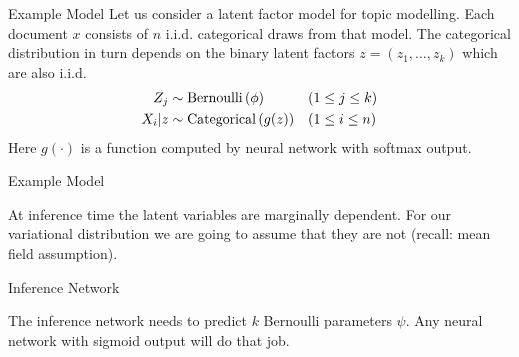 \documentclass[14pt]{beamer}
\begin{document}
\begin{frame}{Example Model}
Let us consider a latent factor model for topic modelling. Each document $ x $ consists of $ n $ i.i.d.
categorical draws from that model. The categorical distribution in turn depends on the binary latent 
factors $ z = (z_{1},\ldots,z_{k}) $ which are also i.i.d.
\begin{equation*}
\begin{aligned}
Z_{j} &\sim \operatorname{Bernoulli}\left(\phi\right) && (1 \leq j \leq k) \\ 
X_{i}|z &\sim \operatorname{Categorical}\left(g(z)\right) && (1 \leq i \leq n)
\end{aligned}
\end{equation*} 
Here $ g(\cdot) $ is a function computed by neural network with softmax output.
\end{frame}

\begin{frame}{Example Model}
\begin{figure}
\center
{}
\end{figure}
At inference time the latent variables are marginally dependent. For our variational distribution
we are going to assume that they are not (recall: mean field assumption).
\end{frame}

\begin{frame}{Inference Network}
\begin{figure}
\center
{}
\end{figure}
The inference network needs to predict $ k $ Bernoulli parameters $ \psi $. Any neural network with
sigmoid output will do that job.
\end{frame}
\end{document}
